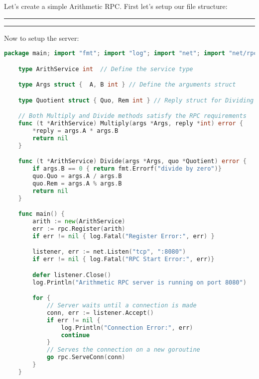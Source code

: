     \begin{Example}
        Let's create a simple Arithmetic RPC. First let's setup our file structure:\\
    \noindent
    \rule {.9\textwidth}{0.5pt}
    
    \noindent
        \rule {.9\textwidth}{0.5pt}
\end{Example}
        
\newpage 

\vspace{-1em}
\begin{Example}

    Now to setup the server:
    \begin{lstlisting}[language=Go, numbers=none]
package main; import "fmt"; import "log"; import "net"; import "net/rpc"

    type ArithService int  // Define the service type

    type Args struct {  A, B int } // Define the arguments struct

    type Quotient struct { Quo, Rem int } // Reply struct for Dividing

    // Both Multiply and Divide methods satisfy the RPC requirements
    func (t *ArithService) Multiply(args *Args, reply *int) error {
        *reply = args.A * args.B
        return nil
    }

    func (t *ArithService) Divide(args *Args, quo *Quotient) error {
        if args.B == 0 { return fmt.Errorf("divide by zero")}
        quo.Quo = args.A / args.B
        quo.Rem = args.A % args.B
        return nil
    }

    func main() {
        arith := new(ArithService)
        err := rpc.Register(arith)
        if err != nil { log.Fatal("Register Error:", err) }

        listener, err := net.Listen("tcp", ":8080")
        if err != nil { log.Fatal("RPC Start Error:", err)}

        defer listener.Close()
        log.Println("Arithmetic RPC server is running on port 8080")

        for {
            // Server waits until a connection is made
            conn, err := listener.Accept()
            if err != nil {
                log.Println("Connection Error:", err)
                continue
            }
            // Serves the connection on a new goroutine
            go rpc.ServeConn(conn)
        }
    }
    \end{lstlisting}
    \end{Example}


